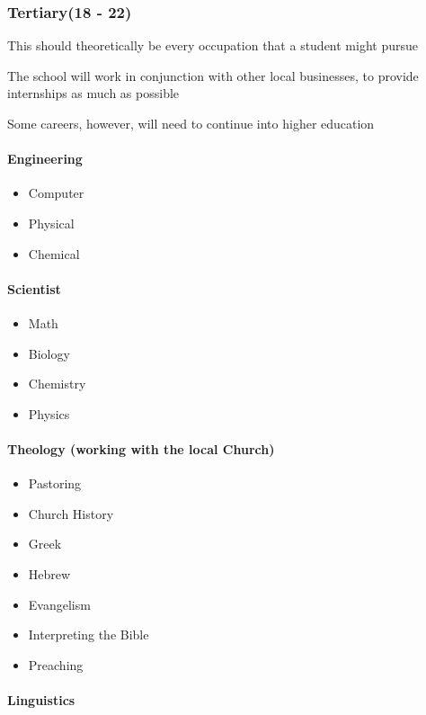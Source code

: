 \documentclass[CSHFoundation.tex]{subfiles}
\begin{document}
\subsubsection{Tertiary(18 - 22)}

This should theoretically be every occupation that a student might pursue

The school will work in conjunction with other local businesses, to provide internships as much as possible

Some careers, however, will need to continue into higher education



\paragraph{Engineering}

\begin{itemize}
\item Computer
\item Physical
\item Chemical
\end{itemize}

\paragraph{Scientist}

\begin{itemize}
\item Math
\item Biology
\item Chemistry
\item Physics
\end{itemize}

\paragraph{Theology (working with the local Church)}

\begin{itemize}
\item Pastoring
\item Church History
\item Greek
\item Hebrew
\item Evangelism
\item Interpreting the Bible
\item Preaching
\end{itemize}

\paragraph{Linguistics}
\end{document}
